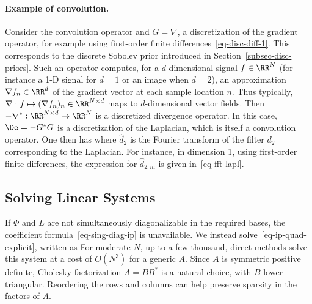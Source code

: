 \paragraph{Example of convolution.}

Consider the convolution operator
and $G=\nabla$, a discretization of the gradient operator, for example using first-order finite differences~\eqref{eq-disc-diff-1}. This corresponds to the discrete Sobolev prior introduced in Section~\ref{subsec-disc-priors}.
%
Such an operator computes, for a $d$-dimensional signal $f \in \RR^N$ (for instance a 1-D signal for $d=1$ or an image when $d=2$), an approximation $\nabla f_n \in \RR^d$ of the gradient vector at each sample location $n$. Thus typically, $\nabla : f \mapsto (\nabla f_n)_n \in \RR^{N \times d}$ maps to $d$-dimensional vector fields.
%
Then $-\nabla^* : \RR^{N \times d} \rightarrow \RR^N$ is a discretized divergence operator.
%
In this case, $\De=-G^*G$ is a discretization of the Laplacian, which is itself a convolution operator. One then has
where $\hat d_2$ is the Fourier transform of the filter $d_2$ corresponding to the Laplacian. For instance, in dimension 1, using first-order finite differences, the expression for $\hat d_{2,m}$ is given in~\eqref{eq-fft-lapl}.




\subsection{Solving Linear Systems}

If $\Phi$ and $L$ are not simultaneously diagonalizable in the required bases, the coefficient formula~\eqref{eq-sing-diag-ip} is unavailable. We instead solve~\eqref{eq-ip-quad-explicit}, written as
For moderate $N$, up to a few thousand, direct methods solve this system at a cost of $O(N^3)$ for a generic $A$. Since $A$ is symmetric positive definite, Cholesky factorization $A=BB^*$ is a natural choice, with $B$ lower triangular. Reordering the rows and columns can help preserve sparsity in the factors of $A$.

